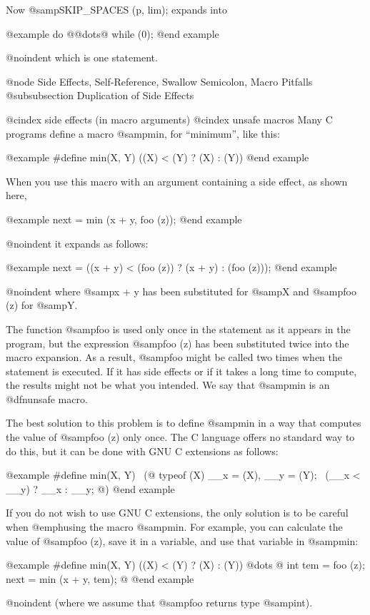 {{Now @samp{SKIP_SPACES (p, lim);} expands into

@example
do @{@dots{}@} while (0);
@end example

@noindent
which is one statement.

@node Side Effects, Self-Reference, Swallow Semicolon, Macro Pitfalls
@subsubsection Duplication of Side Effects

@cindex side effects (in macro arguments)
@cindex unsafe macros
Many C programs define a macro @samp{min}, for ``minimum'', like this:

@example
#define min(X, Y)  ((X) < (Y) ? (X) : (Y))
@end example

When you use this macro with an argument containing a side effect,
as shown here,

@example
next = min (x + y, foo (z));
@end example

@noindent
it expands as follows:

@example
next = ((x + y) < (foo (z)) ? (x + y) : (foo (z)));
@end example

@noindent
where @samp{x + y} has been substituted for @samp{X} and @samp{foo (z)}
for @samp{Y}.

The function @samp{foo} is used only once in the statement as it appears
in the program, but the expression @samp{foo (z)} has been substituted
twice into the macro expansion.  As a result, @samp{foo} might be called
two times when the statement is executed.  If it has side effects or
if it takes a long time to compute, the results might not be what you
intended.  We say that @samp{min} is an @dfn{unsafe} macro.

The best solution to this problem is to define @samp{min} in a way that
computes the value of @samp{foo (z)} only once.  The C language offers no
standard way to do this, but it can be done with GNU C extensions as
follows:

@example
#define min(X, Y)                     \
(@{ typeof (X) __x = (X), __y = (Y);   \
   (__x < __y) ? __x : __y; @})
@end example

If you do not wish to use GNU C extensions, the only solution is to be
careful when @emph{using} the macro @samp{min}.  For example, you can
calculate the value of @samp{foo (z)}, save it in a variable, and use that
variable in @samp{min}:

@example
#define min(X, Y)  ((X) < (Y) ? (X) : (Y))
@dots{}
@{
  int tem = foo (z);
  next = min (x + y, tem);
@}
@end example

@noindent
(where we assume that @samp{foo} returns type @samp{int}).

}}
